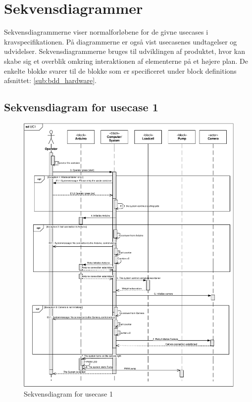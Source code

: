 \section{Sekvensdiagrammer}
Sekvensdiagrammerne viser normalforløbene for de givne usecases i kravspecifikationen. På diagrammerne er også vist usecasenes undtagelser og udvidelser. Sekvensdiagrammerne bruges til udviklingen af produktet, hvor kan skabe sig et overblik omkring interaktionen af elementerne på et højere plan. De enkelte blokke svarer til de blokke som er specificeret under block definitions afsnittet: \ref{sub:bdd_hardware}.  

\subsection{Sekvensdiagram for usecase 1} 
\begin{figure}[H]
	\centering
	\includegraphics[width=1\textwidth]{pdf/UC1_cropped.pdf}
	\caption{Sekvensdiagram for usecase 1}
	\label{fig:uc1}
\end{figure}

